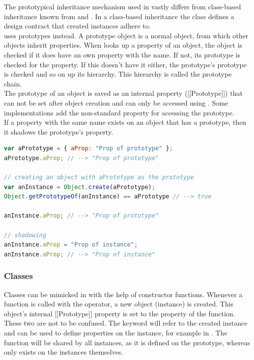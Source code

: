 The prototypical inheritance mechanism used in  vastly differs from class-based inheritance known from  and . In a class-based inheritance the class defines a design contract that created instances adhere to.\\
 uses prototypes instead. A prototype object is a normal  object, from which other objects inherit properties. When  looks up a property of an object, the object is checked if it does have an own property with the name. If not, its prototype is checked for the property. If this doesn't have it either, the prototype's prototype is checked and so on up its hierarchy. This hierarchy is called the prototype chain.\\
The prototype of an object is saved as an internal property ([[Prototype]]) that can not be set after object creation and can only be accessed using \linebreak{}. Some implementations add the non-standard \linebreak{} property for accessing the prototype.\\
If a property with the same name exists on an object that has a prototype, then it shadows the prototype's property.

\SingleSpacing
\begin{lstlisting}[language=JavaScript, caption=Prototypes]
var aPrototype = { aProp: "Prop of prototype" };
aPrototype.aProp; // --> "Prop of prototype"

// creating an object with aPrototype as the prototype
var anInstance = Object.create(aPrototype);
Object.getPrototypeOf(anInstance) == aPrototype // --> true

anInstance.aProp; // --> "Prop of prototype"

// shadowing
anInstance.aProp = "Prop of instance";
anInstance.aProp; // --> "Prop of instance"
\end{lstlisting}
\OnehalfSpacing

\subsubsection{Classes}
\label{sec:JSClasses}

Classes can be mimicked in  with the help of constructor functions. Whenever a function is called with the  operator, a new object (instance) is created. This object's internal [[Prototype]] property is set to the  property of the function. These two are not to be confused. The  keyword will refer to the created instance and can be used to define properties on the instance, for example  in . The  function will be shared by all instances, as it is defined on the prototype, whereas  only exists on the instances themselves.


